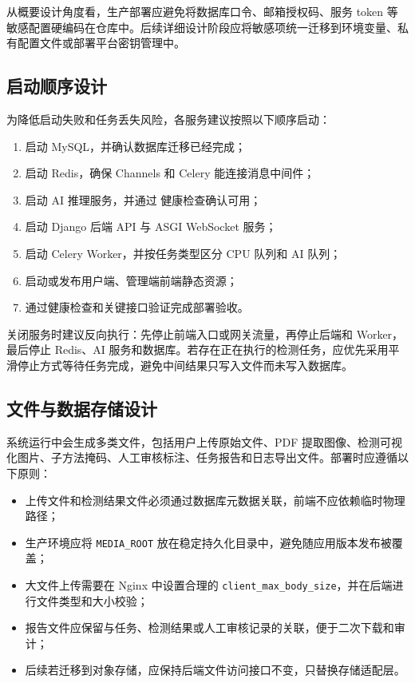 从概要设计角度看，生产部署应避免将数据库口令、邮箱授权码、服务 token 等敏感配置硬编码在仓库中。后续详细设计阶段应将敏感项统一迁移到环境变量、私有配置文件或部署平台密钥管理中。

\subsection{启动顺序设计}
为降低启动失败和任务丢失风险，各服务建议按照以下顺序启动：
\begin{enumerate}[leftmargin=2em]
    \item 启动 MySQL，并确认数据库迁移已经完成；
    \item 启动 Redis，确保 Channels 和 Celery 能连接消息中间件；
    \item 启动 AI 推理服务，并通过  健康检查确认可用；
    \item 启动 Django 后端 API 与 ASGI WebSocket 服务；
    \item 启动 Celery Worker，并按任务类型区分 CPU 队列和 AI 队列；
    \item 启动或发布用户端、管理端前端静态资源；
    \item 通过健康检查和关键接口验证完成部署验收。
\end{enumerate}

关闭服务时建议反向执行：先停止前端入口或网关流量，再停止后端和 Worker，最后停止 Redis、AI 服务和数据库。若存在正在执行的检测任务，应优先采用平滑停止方式等待任务完成，避免中间结果只写入文件而未写入数据库。

\subsection{文件与数据存储设计}
系统运行中会生成多类文件，包括用户上传原始文件、PDF 提取图像、检测可视化图片、子方法掩码、人工审核标注、任务报告和日志导出文件。部署时应遵循以下原则：
\begin{itemize}[leftmargin=2em]
    \item 上传文件和检测结果文件必须通过数据库元数据关联，前端不应依赖临时物理路径；
    \item 生产环境应将 \texttt{MEDIA\_ROOT} 放在稳定持久化目录中，避免随应用版本发布被覆盖；
    \item 大文件上传需要在 Nginx 中设置合理的 \texttt{client\_max\_body\_size}，并在后端进行文件类型和大小校验；
    \item 报告文件应保留与任务、检测结果或人工审核记录的关联，便于二次下载和审计；
    \item 后续若迁移到对象存储，应保持后端文件访问接口不变，只替换存储适配层。
\end{itemize}

